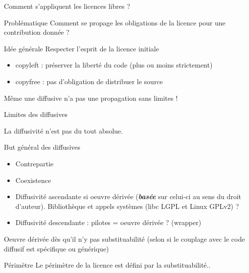 \documentclass{beamer}
\begin{document}
\begin{frame}{Comment s'appliquent les licences libres ?}

  \begin{alertblock}{Problématique}
    Comment se propage les obligations de la licence pour une contribution donnée ? 
  \end{alertblock}

  \begin{block}{Idée générale}
    Respecter l'esprit de la licence initiale    
  \end{block}

  \begin{itemize}
  \item copyleft : préserver la liberté du code (plus ou moins strictement)
  \item copyfree : pas d'obligation de distribuer le source
  \end{itemize}

Même une diffusive n'a pas une propagation sans limites !
  
\end{frame}


\begin{frame}{Limites des diffusives}

La diffusivité n'est pas du tout absolue.

  \begin{block}{But général des diffusives}
    \begin{itemize}
    \item Contrepartie
    \item Coexistence
    \end{itemize}
  \end{block}

  \begin{itemize}
  \item Diffusivité ascendante si oeuvre dérivée (\textbf{\textit{basée}} sur celui-ci au sens du droit d'auteur). Bibliothèque et appels systèmes (libc LGPL et Linux GPLv2) ? 
  \item Diffusivité descendante : pilotes = oeuvre dérivée ? (wrapper)
  \end{itemize}

Oeuvre dérivée dès qu'il n'y pas substituabilité (selon si le couplage avec le code diffusif est spécifique ou générique)

  \begin{alertblock}{Périmètre}
    Le périmètre de la licence est défini par la substituabilité..
  \end{alertblock}
\end{frame}
\end{document}

